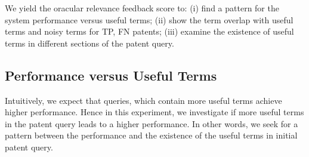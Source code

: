 We yield the oracular relevance feedback score to: (i) find a pattern for the system performance versus useful terms; (ii) show the term overlap with useful terms and noisy terms for TP, FN patents; (iii)  examine the existence of useful terms in different sections of the patent query.
\subsection{Performance versus Useful Terms}
\label{PerformanceUsefulTerms}
Intuitively, we expect that queries, which contain more useful terms achieve higher performance. Hence in this experiment,
we investigate if more useful terms in the patent query leads to a higher performance. In other words, we seek for a pattern between the performance and the existence of the useful terms in initial patent query. 

